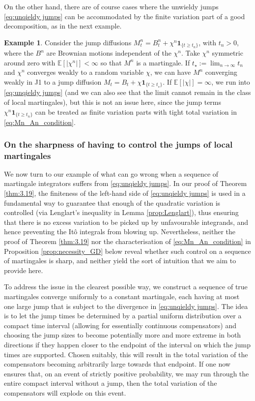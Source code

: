 \documentclass[11pt]{article}
\theoremstyle{definition}\newtheorem{example}[theorem]{Example}
\theoremstyle{definition}\newtheorem{counterexample}[theorem]{Counterexample}
\theoremstyle{definition}\newtheorem{remark}[theorem]{Remark}
\theoremstyle{definition}\newtheorem{defi}[theorem]{Definition}
\numberwithin{equation}{section}
\renewcommand{\|}{\; : \, \;}											%
\begin{document}
On the other hand, there are of course cases where the unwieldy jumps \eqref{eq:unqieldy jumps} can be accommodated by the finite variation part of a good decomposition, as in the next example.

\begin{example}
	Consider the jump diffusions $M^n_t=B^n_t + \chi^n \mathbf{1}_{ \{ t\geq t_n\} }$, with $t_n>0$, where the $B^n$ are Brownian motions independent of the $\chi^n$. Take $\chi^n$ symmetric around zero with $\mathbb{E}[|\chi^n|]<\infty$ so that $M^n$ is a martingale. If $t_\star:=\lim_{n\rightarrow \infty} t_n$ and $\chi^n$ converges weakly to a random variable $\chi$, we can have $M^n$ converging weakly in J1 to a jump diffusion $M_t=B_t+\chi\mathbf{1}_{\{ t\geq t_\star\}}$. If $\mathbb{E}[|\chi|]=\infty$, we run into \eqref{eq:unqieldy jumps} (and we can also see that the limit cannot remain in the class of local martingales), but this is not an issue here, since the jump terms $\chi^n \mathbf{1}_{\{t\geq t_n\}}$ can be treated as finite variation parts with tight total variation in \eqref{eq:Mn_An_condition}.
\end{example}

\subsubsection{On the sharpness of having to control the jumps of local martingales}

We now turn to our example of what can go wrong when a sequence of martingale integrators suffers from \eqref{eq:unqieldy jumps}. In our proof of Theorem \ref{thm:3.19}, the finiteness of the left-hand side of \eqref{eq:unqieldy jumps} is used in a fundamental way to guarantee that enough of the quadratic variation is controlled (via Lenglart's inequality in Lemma \ref{prop:Lenglart}), thus ensuring that there is no excess variation to be picked up by unfavourable integrands, and hence preventing the Itô integrals from blowing up. Nevertheless, neither the proof of Theorem \ref{thm:3.19} nor the characterisation of \eqref{eq:Mn_An_condition} in Proposition \ref{prop:necessity_GD} below reveal whether such control on a sequence of martingales is sharp, and neither yield the sort of intuition that we aim to provide here.



To address the issue in the clearest possible way, we construct a sequence of true martingales converge uniformly to a constant martingale, each having at most one large jump that is subject to the divergence in \eqref{eq:unqieldy jumps}. The idea is to let the jump times be determined by a partial uniform distribution over a compact time interval (allowing for essentially continuous compensators) and choosing the jump sizes to become potentially more and more extreme in both directions if they happen closer to the endpoint of the interval on which the jump times are supported. Chosen suitably, this will result in the total variation of the compensators becoming arbitrarily large towards that endpoint. If one now ensures that, on an event of strictly positive probability, we may run through the entire compact interval without a jump, then the total variation of the compensators will explode on this event.
\end{document}
